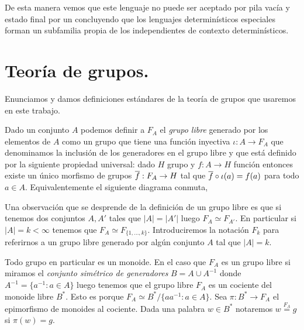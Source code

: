\documentclass[tesis.tex]{subfiles}
\begin{document}
\begin{ej}
	De esta manera vemos que este lenguaje no puede ser aceptado por pila vacía y estado final por un \APD concluyendo que los lenguajes determinísticos especiales forman un subfamilia propia de los independientes de contexto determinísticos.
\end{ej}


\section{Teoría de grupos.}\label{secc_teo_grp}

Enunciamos y damos definiciones estándares de la teoría de grupos que usaremos en este trabajo.


\begin{deff}
	Dado un conjunto $A$ podemos definir a $F_{A}$ el \emph{grupo libre} generado por los elementos de $A$ como un grupo que tiene una función inyectiva $\iota: A \to F_{A}$ que denominamos la inclusión de los generadores en el grupo libre y que está definido por la siguiente propiedad universal: 
	dado $H$ grupo y $f:A \to H$ función entonces existe un único morfismo de grupos $\overline f: F_{A} \to H$ tal que $\overline f \circ \iota (a) = f(a)$ para todo $a \in A$.
	Equivalentemente el siguiente diagrama conmuta,
	\begin{center}
	\end{center}
	
\end{deff}

\begin{obs}
	Una observación que se desprende de la definición de un grupo libre es que si tenemos dos conjuntos $A, A'$ tales que $|A| = |A'|$ luego $F_{A} \simeq F_{A'}$.
	En particular si $|A|=k < \infty$ tenemos que $F_{A} \simeq F_{ \{1, \dots, k \} }$.
	Introduciremos la notación $F_{k}$ para referirnos a un grupo libre generado por algún conjunto $A$ tal que $|A| = k$.
\end{obs}

Todo grupo en particular es un monoide.
En el caso que $F_{A}$ es un grupo libre si miramos el \emph{conjunto simétrico de generadores} $B = A \cup A^{-1}$ donde $A^{-1} = \{ a^{-1} : a \in A \}$ luego tenemos que el grupo libre $F_{A}$ es un cociente del monoide libre $B^*$.
Esto es porque $F_{A} \simeq B^{*} / \{ aa^{-1} : a \in A \}$.
Sea $\pi: B^{*} \to F_{A}$ el epimorfismo de monoides al cociente.
Dada una palabra $w \in B^{*}$ notaremos $w \overset{F_{A}}{=} g$ si $\pi(w) = g$.
\end{document}
